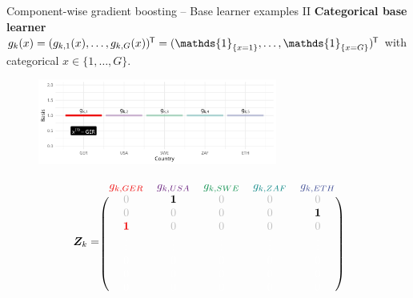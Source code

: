 \documentclass[10pt]{beamer}
\begin{document}
\begin{frame}{Component-wise gradient boosting -- Base learner examples II}
  \textbf{Categorical base learner} $g_k(x) = (g_{k,1}(x), \dots, g_{k,G}(x))^\tran = (\mathds{1}_{\{x = 1\}}, \dots, \mathds{1}_{\{x = G\}})^\tran$ with categorical $x\in\{1, \dots, G\}$.

  \begin{center}
    \begin{figure}
      \includegraphics[width=0.7\textwidth]{figures/bs-cat/fig-cat3.png}
    \end{figure}
    \vspace{-0.5cm}
    \scriptsize
    $$
      \design_k = \begin{blockarray}{ccccc}
        \color[HTML]{EE0000}g_{k,GER} & \color[HTML]{631879}g_{k,USA} & \color[HTML]{008B45}g_{k,SWE} & \color[HTML]{008280}g_{k,ZAF} & \color[HTML]{3B4992}g_{k,ETH}\\
      \begin{block}{(ccccc)}
        \color{lightgray}0 & \color{black}\bm{1} & \color{lightgray}0 & \color{lightgray}0 & \color{lightgray}0 \\
      \color{lightgray}0 & \color{lightgray}0 & \color{lightgray}0 & \color{lightgray}0 & \color{black}\bm{1} \\
      \color[HTML]{EE0000}\bm{1} & \color{lightgray}0 & \color{lightgray}0 & \color{lightgray}0 & \color{lightgray}0 \\
      \color{white}\vdots & \color{white}\vdots & \color{white}\vdots & \color{white}\vdots & \color{white}\vdots \\
      \color{white}0 & \color{white}0 & \color{white}0 & \color{white}0 & \color{white}0 \\
      \color{white}0 & \color{white}0 & \color{white}0 & \color{white}0 & \color{white}0 \\
      \color{white}0 & \color{white}0 & \color{white}0 & \color{white}0 & \color{white}0 \color{black}\\
      \end{block}
    \end{blockarray}
    $$
    \normalsize
  \end{center}
\end{frame}
\end{document}
